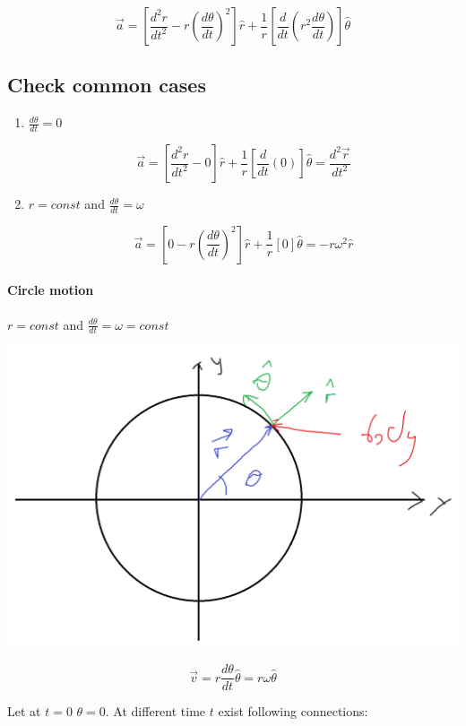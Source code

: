 $$\vec{a} = \left[ \frac{d^2r}{dt^2} - r\left( \frac{d\theta}{dt} \right)^2 \right]\hat{r} + \frac{1}{r} \left[ \frac{d}{dt}\left( r^2 \frac{d\theta}{dt} \right) \right]\hat{\theta}$$


\subsection{Check common cases}
\begin{enumerate}
	\item $\frac{{d\theta}}{dt} = 0 $
	
	$$	\vec{a} = \left[ \frac{d^2r}{dt^2} - 0 \right]\hat{r} + \frac{1}{r} \left[ \frac{d}{dt}\left( 0 \right) \right]\hat{\theta} =  \frac{d^2\vec{r}}{dt^2}$$
	\item $r = const $ and $\frac{d\theta}{dt} = \omega$
	
	$$\vec{a} = \left[ 0 - r\left( \frac{d\theta}{dt} \right)^2 \right]\hat{r} + \frac{1}{r} \left[ 0 \right]\hat{\theta} = -r\omega^2\hat{r}$$
\end{enumerate}

\paragraph{Circle motion} $r = const$ and $\frac{d\theta}{dt} = \omega = const$

\begin{center}
	\includegraphics[width=\linewidth]{./lect4/pic2.png}
\end{center}

$$\vec{v} = r \frac{d\theta}{dt}\hat{\theta} = r\omega\hat{\theta}$$

Let at $t=0$ $\theta=0$. At different time $t$ exist following connections:

